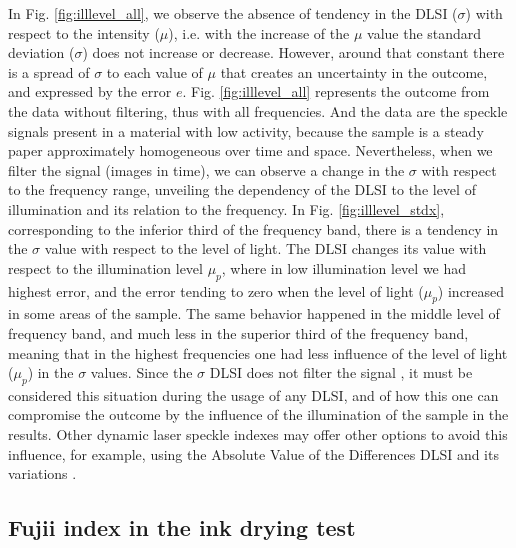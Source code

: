 \documentclass[review]{elsarticle}
\begin{document}
In Fig. \ref{fig:illlevel_all}, we observe the absence of tendency in the DLSI ($\sigma$) 
with respect to the intensity ($\mu$), 
i.e. with the increase of the $\mu$ value the standard deviation ($\sigma$) does not increase or decrease. 
However, around that constant there is a spread of $\sigma$ to each value of $\mu$ that creates an uncertainty in the outcome, 
and expressed by the error $e$. 
Fig. \ref{fig:illlevel_all} represents the outcome from the data without filtering, thus with all frequencies. 
And the data are the speckle signals present in a material with low activity, 
because the sample is a steady paper approximately homogeneous over time and space.
Nevertheless, when we filter the signal (images in time), 
we can observe a change in the $\sigma$ with respect to the frequency range, 
unveiling the dependency of the DLSI to the level of illumination and its relation to the frequency.
In Fig. \ref{fig:illlevel_stdx}, corresponding to the inferior third of the frequency band, 
there is a tendency in the $\sigma$ value with respect to the level of light. 
The DLSI changes its value with respect to the illumination level $\mu_p$, 
where in low illumination level we had highest error, 
and the error tending to zero when the level of light ($\mu_p$) increased in some areas of the sample. 
The same behavior happened in the middle level of frequency band, 
and much less in the superior third of the frequency band, 
meaning that in the highest frequencies one had less influence of the level of light ($\mu_p$) in the $\sigma$ values. 
Since the $\sigma$ DLSI does not filter the signal \cite{RIVERA2017144}, 
it must be considered this situation during the usage of any DLSI, 
and of how this one can compromise the outcome by the influence of the illumination of the sample in the results.
Other dynamic laser speckle indexes may offer other options to avoid this influence,
for example, using the Absolute Value of the Differences DLSI and its variations \cite{BSLTLBOOK}.

\subsection{Fujii index in the ink drying test} 
\label{subsec:vsfujii}
\end{document}
